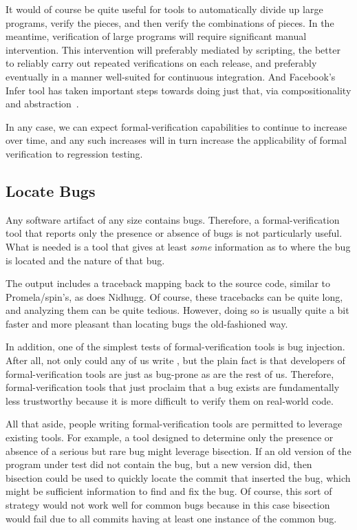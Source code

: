 It would of course be quite useful for tools to automatically divide
up large programs, verify the pieces, and then verify the combinations
of pieces.
In the meantime, verification of large programs will require significant
manual intervention.
This intervention will preferably mediated by scripting, the better to
reliably carry out repeated verifications on each release, and
preferably eventually in a manner well-suited for continuous integration.
And Facebook's Infer tool has taken important steps towards doing just
that, via compositionality and
abstraction~\cite{SamBlackshear2018RacerD,DinoDistefano2019FBstaticAnalysis}.

In any case, we can expect formal-verification capabilities to continue
to increase over time, and any such increases will in turn increase
the applicability of formal verification to regression testing.

\subsection{Locate Bugs}
\label{sec:future:Locate Bugs}

Any software artifact of any size contains bugs.
Therefore, a formal-verification tool that reports only the
presence or absence of bugs is not particularly useful.
What is needed is a tool that gives at least \emph{some} information
as to where the bug is located and the nature of that bug.

The  output includes a traceback mapping back to the source
code, similar to Promela/spin's, as does Nidhugg.
Of course, these tracebacks can be quite long, and analyzing them
can be quite tedious.
However, doing so is usually quite a bit faster
and more pleasant than locating bugs the old-fashioned way.

In addition, one of the simplest tests of formal-verification tools is
bug injection.
After all, not only could any of us write
, but the plain fact is that
developers of formal-verification tools are just as bug-prone as
are the rest of us.
Therefore, formal-verification tools that just proclaim that a
bug exists are fundamentally less trustworthy because it is
more difficult to verify them on real-world code.

All that aside, people writing formal-verification tools are
permitted to leverage existing tools.
For example, a tool designed to determine only the presence
or absence of a serious but rare bug might leverage bisection.
If an old version of the program under test did not contain the bug,
but a new version did, then bisection could be used to quickly
locate the commit that inserted the bug, which might be
sufficient information to find and fix the bug.
Of course, this sort of strategy would not work well for common
bugs because in this case bisection would fail due to all commits
having at least one instance of the common bug.

